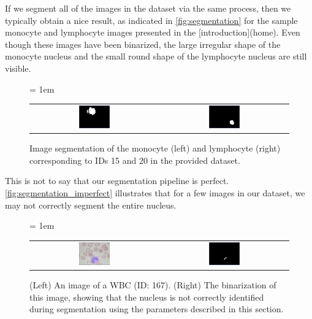 If we segment all of the images in the dataset via the same process, then we typically obtain a nice result, as indicated in \autoref{fig:segmentation} for the sample monocyte and lymphocyte images presented in the [introduction](home). Even though these images have been binarized, the large irregular shape of the monocyte nucleus and the small round shape of the lymphocyte nucleus are still visible.

\begin{figure}[h]
\centering
\tabcolsep = 1em
\mySfFamily
\begin{tabular}{c c}
\includegraphics[width = 0.25\textwidth]{../images/monocyte_binarized.png} & \includegraphics[width = 0.25\textwidth]{../images/lymphocyte_binarized.png}
\end{tabular}
\caption{Image segmentation of the monocyte (left) and lymphocyte (right) corresponding to IDs 15 and 20 in the provided dataset.}
\label{fig:segmentation}
\end{figure}

This is not to say that our segmentation pipeline is perfect. \autoref{fig:segmentation_imperfect} illustrates that for a few images in our dataset, we may not correctly segment the entire nucleus.

\begin{figure}[h]
\centering
\tabcolsep = 1em
\mySfFamily
\begin{tabular}{c c}
\includegraphics[width = 0.25\textwidth]{../images/WBC_167.png} & \includegraphics[width = 0.25\textwidth]{../images/WBC_167_segmentation.png}
\end{tabular}
\caption{(Left) An image of a WBC (ID: 167). (Right) The binarization of this image, showing that the nucleus is not correctly identified during segmentation using the parameters described in this section.}
\label{fig:segmentation_imperfect}
\end{figure}

